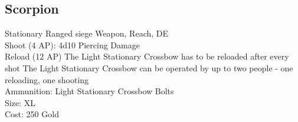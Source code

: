 \subsection{Scorpion}\label{weapon:scorpion}
Stationary Ranged siege Weapon,  Reach, DE\\
Shoot (4 AP): 4d10 Piercing Damage\\
Reload (12 AP) The Light Stationary Crossbow has to be reloaded after every shot
The Light Stationary Crossbow can be operated by up to two people - one reloading, one shooting\\
Ammunition: Light Stationary Crossbow Bolts\\
Size: XL\\
Cost: 250 Gold\\